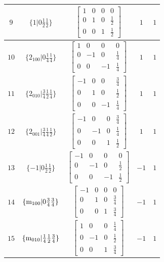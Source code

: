 \documentclass[fleqn,8pt]{jsarticle}
\begin{document}
\begin{longtable}{ccccc}
$ 9 $ & $ \{1|0 \frac{1}{2} \frac{1}{2}\} $ & $ \begin{bmatrix} 1 & 0 & 0 & 0 \\ 0 & 1 & 0 & \frac{1}{2} \\ 0 & 0 & 1 & \frac{1}{2} \end{bmatrix} $ & $ 1 $ & $ 1 $ \\ \hline
$ 10 $ & $ \{2{}_{100}|0 \frac{1}{4} \frac{1}{4}\} $ & $ \begin{bmatrix} 1 & 0 & 0 & 0 \\ 0 & -1 & 0 & \frac{1}{4} \\ 0 & 0 & -1 & \frac{1}{4} \end{bmatrix} $ & $ 1 $ & $ 1 $ \\ \hline
$ 11 $ & $ \{2{}_{010}|\frac{3}{4} \frac{1}{2} \frac{1}{4}\} $ & $ \begin{bmatrix} -1 & 0 & 0 & \frac{3}{4} \\ 0 & 1 & 0 & \frac{1}{2} \\ 0 & 0 & -1 & \frac{1}{4} \end{bmatrix} $ & $ 1 $ & $ 1 $ \\ \hline
$ 12 $ & $ \{2{}_{001}|\frac{3}{4} \frac{1}{4} \frac{1}{2}\} $ & $ \begin{bmatrix} -1 & 0 & 0 & \frac{3}{4} \\ 0 & -1 & 0 & \frac{1}{4} \\ 0 & 0 & 1 & \frac{1}{2} \end{bmatrix} $ & $ 1 $ & $ 1 $ \\ \hline
$ 13 $ & $ \{-1|0 \frac{1}{2} \frac{1}{2}\} $ & $ \begin{bmatrix} -1 & 0 & 0 & 0 \\ 0 & -1 & 0 & \frac{1}{2} \\ 0 & 0 & -1 & \frac{1}{2} \end{bmatrix} $ & $ -1 $ & $ 1 $ \\ \hline
$ 14 $ & $ \{{\rm m}_{100}|0 \frac{3}{4} \frac{3}{4}\} $ & $ \begin{bmatrix} -1 & 0 & 0 & 0 \\ 0 & 1 & 0 & \frac{3}{4} \\ 0 & 0 & 1 & \frac{3}{4} \end{bmatrix} $ & $ -1 $ & $ 1 $ \\ \hline
$ 15 $ & $ \{{\rm m}_{010}|\frac{1}{4} \frac{1}{2} \frac{3}{4}\} $ & $ \begin{bmatrix} 1 & 0 & 0 & \frac{1}{4} \\ 0 & -1 & 0 & \frac{1}{2} \\ 0 & 0 & 1 & \frac{3}{4} \end{bmatrix} $ & $ -1 $ & $ 1 $ \\ \hline

\end{longtable}
\end{document}
